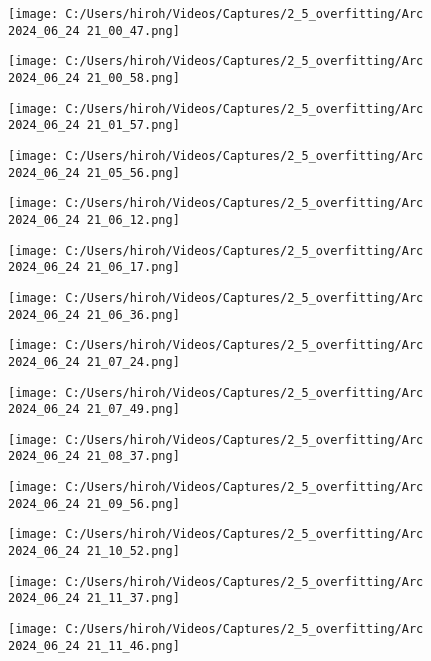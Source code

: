 \documentclass{ltjsarticle}
\begin{document}
\begin{figure}[htbp]
  \centering
  \texttt{[image: C:/Users/hiroh/Videos/Captures/2\_5\_overfitting/Arc 2024\_06\_24 21\_00\_47.png]}
\end{figure}
\begin{figure}[htbp]
  \centering
  \texttt{[image: C:/Users/hiroh/Videos/Captures/2\_5\_overfitting/Arc 2024\_06\_24 21\_00\_58.png]}
\end{figure}
\begin{figure}[htbp]
  \centering
  \texttt{[image: C:/Users/hiroh/Videos/Captures/2\_5\_overfitting/Arc 2024\_06\_24 21\_01\_57.png]}
\end{figure}
\begin{figure}[htbp]
  \centering
  \texttt{[image: C:/Users/hiroh/Videos/Captures/2\_5\_overfitting/Arc 2024\_06\_24 21\_05\_56.png]}
\end{figure}
\begin{figure}[htbp]
  \centering
  \texttt{[image: C:/Users/hiroh/Videos/Captures/2\_5\_overfitting/Arc 2024\_06\_24 21\_06\_12.png]}
\end{figure}
\begin{figure}[htbp]
  \centering
  \texttt{[image: C:/Users/hiroh/Videos/Captures/2\_5\_overfitting/Arc 2024\_06\_24 21\_06\_17.png]}
\end{figure}
\begin{figure}[htbp]
  \centering
  \texttt{[image: C:/Users/hiroh/Videos/Captures/2\_5\_overfitting/Arc 2024\_06\_24 21\_06\_36.png]}
\end{figure}
\begin{figure}[htbp]
  \centering
  \texttt{[image: C:/Users/hiroh/Videos/Captures/2\_5\_overfitting/Arc 2024\_06\_24 21\_07\_24.png]}
\end{figure}
\begin{figure}[htbp]
  \centering
  \texttt{[image: C:/Users/hiroh/Videos/Captures/2\_5\_overfitting/Arc 2024\_06\_24 21\_07\_49.png]}
\end{figure}
\begin{figure}[htbp]
  \centering
  \texttt{[image: C:/Users/hiroh/Videos/Captures/2\_5\_overfitting/Arc 2024\_06\_24 21\_08\_37.png]}
\end{figure}
\begin{figure}[htbp]
  \centering
  \texttt{[image: C:/Users/hiroh/Videos/Captures/2\_5\_overfitting/Arc 2024\_06\_24 21\_09\_56.png]}
\end{figure}
\begin{figure}[htbp]
  \centering
  \texttt{[image: C:/Users/hiroh/Videos/Captures/2\_5\_overfitting/Arc 2024\_06\_24 21\_10\_52.png]}
\end{figure}
\begin{figure}[htbp]
  \centering
  \texttt{[image: C:/Users/hiroh/Videos/Captures/2\_5\_overfitting/Arc 2024\_06\_24 21\_11\_37.png]}
\end{figure}
\begin{figure}[htbp]
  \centering
  \texttt{[image: C:/Users/hiroh/Videos/Captures/2\_5\_overfitting/Arc 2024\_06\_24 21\_11\_46.png]}
\end{figure}
\end{document}
